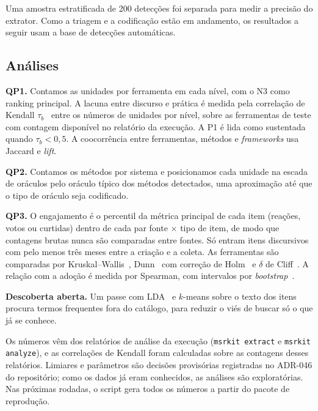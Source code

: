 \documentclass[sigconf]{acmart}
\begin{document}
Uma amostra estratificada de 200 detecções foi separada para medir a precisão do extrator. Como a triagem e a codificação estão em andamento, os resultados a seguir usam a base de detecções automáticas.

\subsection{Análises}

\textbf{QP1.} Contamos as unidades por ferramenta em cada nível, com o N3 como ranking principal. A lacuna entre discurso e prática é medida pela correlação de Kendall $\tau_b$~\cite{kendall1938} entre os números de unidades por nível, sobre as ferramentas de teste com contagem disponível no relatório da execução. A P1 é lida como sustentada quando $\tau_b < 0{,}5$. A coocorrência entre ferramentas, métodos e \textit{frameworks} usa Jaccard e \textit{lift}.

\textbf{QP2.} Contamos os métodos por sistema e posicionamos cada unidade na escada de oráculos pelo oráculo típico dos métodos detectados, uma aproximação até que o tipo de oráculo seja codificado.

\textbf{QP3.} O engajamento é o percentil da métrica principal de cada item (reações, votos ou curtidas) dentro de cada par fonte $\times$ tipo de item, de modo que contagens brutas nunca são comparadas entre fontes. Só entram itens discursivos com pelo menos três meses entre a criação e a coleta. As ferramentas são comparadas por Kruskal--Wallis~\cite{kruskal1952}, Dunn~\cite{dunn1964} com correção de Holm~\cite{holm1979} e $\delta$ de Cliff~\cite{cliff1993dominance}. A relação com a adoção é medida por Spearman, com intervalos por \textit{bootstrap}~\cite{efron1993bootstrap}.

\textbf{Descoberta aberta.} Um passe com LDA~\cite{blei2003lda} e $k$-means sobre o texto dos itens procura termos frequentes fora do catálogo, para reduzir o viés de buscar só o que já se conhece.

Os números vêm dos relatórios de análise da execução (\texttt{msrkit extract} e \texttt{msrkit analyze}), e as correlações de Kendall foram calculadas sobre as contagens desses relatórios. Limiares e parâmetros são decisões provisórias registradas no ADR-046 do repositório; como os dados já eram conhecidos, as análises são exploratórias. Nas próximas rodadas, o script  gera todos os números a partir do pacote de reprodução.

\end{document}
